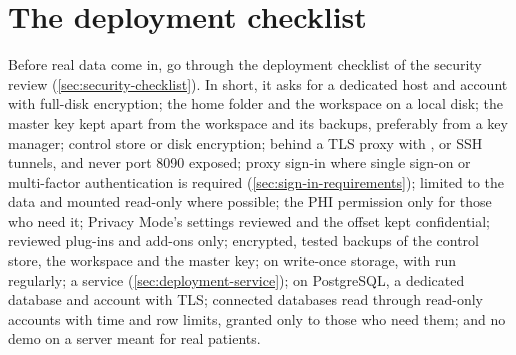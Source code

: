 \section{The deployment checklist}
\label{sec:deployment-checklist}

Before real data come in, go through the deployment checklist of the security review
(\cref{sec:security-checklist}). In short, it asks for a dedicated host and account with
full-disk encryption; the home folder and the workspace on a local disk; the master key kept
apart from the workspace and its backups, preferably from a key manager; control store or disk
encryption;
 behind a TLS proxy with , or SSH tunnels,
and never port 8090 exposed; proxy sign-in where single sign-on or multi-factor authentication is
required (\cref{sec:sign-in-requirements});  limited to the data and mounted
read-only where possible; the PHI permission only for those who need it; Privacy Mode's settings
reviewed and the offset kept confidential; reviewed plug-ins and add-ons only; encrypted, tested
backups of the control store, the workspace and the master key;  on write-once storage, with  run
regularly; a service (\cref{sec:deployment-service}); on PostgreSQL, a dedicated database and
account with TLS; connected databases read through read-only accounts with time and row limits,
granted only to those who need them;
and no demo on a server meant for real patients.
